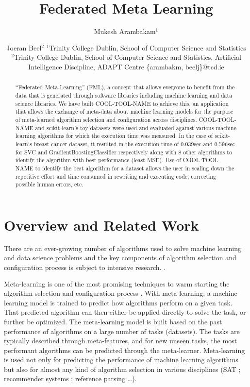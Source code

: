 \documentclass{article}
\title{Federated Meta Learning}
\author{
Mukesh Arambakam$^1$
\and
Joeran Beel$^2$
\affiliations
$^1$Trinity College Dublin,
School of Computer Science and Statistics\\
$^2$Trinity College Dublin,
School of Computer Science and Statistics,
Artificial Intelligence Discipline,
ADAPT Centre
\emails
\{arambakm, beelj\}@tcd.ie
}
\begin{document}
\maketitle

\begin{abstract}
“Federated Meta-Learning” (FML), a concept that allows everyone to benefit from the data that is generated through software libraries including machine learning and data science libraries. We have built COOL-TOOL-NAME to achieve this, an application that allows the exchange of meta-data about machine learning models for the purpose of meta-learned algorithm selection and configuration across disciplines.
COOL-TOOL-NAME and scikit-learn's toy datasets were used and evaluated against various machine learning algorithms for which the execution time was measured. In the case of scikit-learn’s breast cancer dataset, it resulted in the execution time of 0.039sec and 0.596sec for SVC and GradientBoostingClassifier respectively along with 8 other algorithms to identify the algorithm with best performance (least MSE). Use of COOL-TOOL-NAME to identify the best algorithm for a dataset allows the user in scaling down the repetitive effort and time consumed in rewriting and executing code, correcting possible human errors, etc.
\end{abstract}

\section{Overview and Related Work}
There are an ever-growing number of algorithms used to solve machine learning and data science problems and the key components of algorithm selection and configuration process is subject to intensive research. \cite{bischl-et-al,brazdil:p,calandra-et-al,collins-et-al2018,cunha-et-al2017,edenhofer-et-al,ferrari-et-al,hutter-et-al,kotthoff:l,lindauer-et-al,romero-et-al,tu:w,vartak-et-al}.

Meta-learning is one of the most promising techniques to warm starting the algorithm selection and configuration process \cite{hutter-et-al}. With meta-learning, a machine learning model is trained to predict how algorithms perform on a given task. That predicted algorithm can then either be applied directly to solve the task, or further be optimized. The meta-learning model is built based on the past performance of algorithms on a large number of tasks (datasets). The tasks are typically described through meta-features, and for new unseen tasks, the most performant algorithms can be predicted through the meta-learner. Meta-learning is used not only for predicting the performance of machine learning algorithms but also for almost any kind of algorithm selection in various disciplines (SAT \cite{xu-et-al}; recommender systems \cite{collins-et-al2019,cunha-et-al2018}; reference parsing \cite{tkaczyk-et-al} …).
\end{document}
